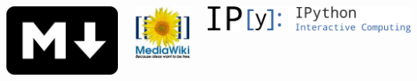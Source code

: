 \documentclass{beamer}
\begin{document}
\begin{frame}
\begin{columns}
\end{columns}
\begin{columns}
\begin{center}  %
  \centerline{\includegraphics[width=0.2\linewidth]{fig/markdown_logo.jpg}}
\end{center}


\begin{center}  %
  \centerline{\includegraphics[width=0.2\linewidth]{fig/MediaWiki_logo.jpg}}
\end{center}


\begin{center}  %
  \centerline{\includegraphics[width=0.6\linewidth]{fig/IPython_logo.png}}
\end{center}


\end{columns}
\end{frame}
\end{document}

